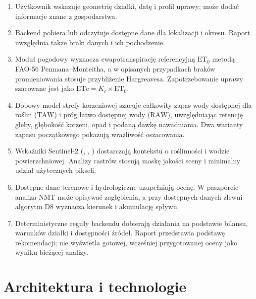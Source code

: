 \documentclass[11pt,a4paper]{article}
\newcommand{\code}[1]{\textcolor{PWField}{\texttt{\detokenize{#1}}}}
\begin{document}
\begin{enumerate}
  \item Użytkownik wskazuje geometrię działki, datę i profil uprawy; może dodać informacje znane z gospodarstwa.
  \item Backend pobiera lub odczytuje dostępne dane dla lokalizacji i okresu. Raport uwzględnia także braki danych i ich pochodzenie.
  \item Moduł pogodowy wyznacza ewapotranspirację referencyjną \(\mathrm{ET}_0\) metodą FAO-56 Penmana--Monteitha, a w opisanych przypadkach braków promieniowania stosuje przybliżenie Hargreavesa. Zapotrzebowanie uprawy szacowane jest jako \(\mathrm{ETc}=K_c\times\mathrm{ET}_0\).
  \item Dobowy model strefy korzeniowej szacuje całkowity zapas wody dostępnej dla roślin (\(\mathrm{TAW}\)) i próg łatwo dostępnej wody (\(\mathrm{RAW}\)), uwzględniając retencję gleby, głębokość korzeni, opad i podaną dawkę nawadniania. Dwa warianty zapasu początkowego pokazują wrażliwość oszacowania.
  \item Wskaźniki Sentinel-2 (\code{NDVI}, \code{NDMI}, \code{NDWI}) dostarczają kontekstu o roślinności i wodzie powierzchniowej. Analizy rastrów stosują maskę jakości sceny i minimalny udział użytecznych pikseli.
  \item Dostępne dane terenowe i hydrologiczne uzupełniają ocenę. W paszporcie analiza NMT może opisywać zagłębienia, a przy dostępnych danych zlewni algorytm D8 wyznacza kierunek i akumulację spływu.
  \item Deterministyczne reguły backendu dobierają działania na podstawie bilansu, warunków działki i dostępności źródeł. Raport przedstawia podstawę rekomendacji; nie wyświetla gotowej, wcześniej przygotowanej oceny jako wyniku bieżącej analizy.
\end{enumerate}

\section{Architektura i technologie}
\end{document}
